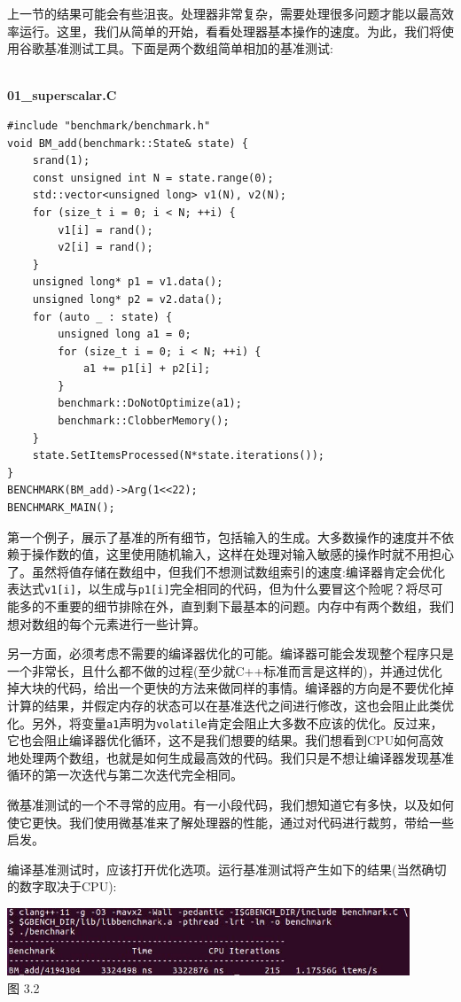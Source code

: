 
上一节的结果可能会有些沮丧。处理器非常复杂，需要处理很多问题才能以最高效率运行。这里，我们从简单的开始，看看处理器基本操作的速度。为此，我们将使用谷歌基准测试工具。下面是两个数组简单相加的基准测试:

\hspace*{\fill} \\ %
\noindent
\textbf{01\_superscalar.C}
\begin{lstlisting}[style=styleCXX]
#include "benchmark/benchmark.h"
void BM_add(benchmark::State& state) {
	srand(1);
	const unsigned int N = state.range(0);
	std::vector<unsigned long> v1(N), v2(N);
	for (size_t i = 0; i < N; ++i) {
		v1[i] = rand();
		v2[i] = rand();
	}
	unsigned long* p1 = v1.data();
	unsigned long* p2 = v2.data();
	for (auto _ : state) {
		unsigned long a1 = 0;
		for (size_t i = 0; i < N; ++i) {
			a1 += p1[i] + p2[i];
		}
		benchmark::DoNotOptimize(a1);
		benchmark::ClobberMemory();
	}
	state.SetItemsProcessed(N*state.iterations());
}
BENCHMARK(BM_add)->Arg(1<<22);
BENCHMARK_MAIN();
\end{lstlisting}

第一个例子，展示了基准的所有细节，包括输入的生成。大多数操作的速度并不依赖于操作数的值，这里使用随机输入，这样在处理对输入敏感的操作时就不用担心了。虽然将值存储在数组中，但我们不想测试数组索引的速度:编译器肯定会优化表达式\texttt{v1[i]}，以生成与\texttt{p1[i]}完全相同的代码，但为什么要冒这个险呢？将尽可能多的不重要的细节排除在外，直到剩下最基本的问题。内存中有两个数组，我们想对数组的每个元素进行一些计算。

另一方面，必须考虑不需要的编译器优化的可能。编译器可能会发现整个程序只是一个非常长，且什么都不做的过程(至少就C++标准而言是这样的)，并通过优化掉大块的代码，给出一个更快的方法来做同样的事情。编译器的方向是不要优化掉计算的结果，并假定内存的状态可以在基准迭代之间进行修改，这也会阻止此类优化。另外，将变量\texttt{a1}声明为\texttt{volatile}肯定会阻止大多数不应该的优化。反过来，它也会阻止编译器优化循环，这不是我们想要的结果。我们想看到CPU如何高效地处理两个数组，也就是如何生成最高效的代码。我们只是不想让编译器发现基准循环的第一次迭代与第二次迭代完全相同。

微基准测试的一个不寻常的应用。有一小段代码，我们想知道它有多快，以及如何使它更快。我们使用微基准来了解处理器的性能，通过对代码进行裁剪，带给一些启发。

编译基准测试时，应该打开优化选项。运行基准测试将产生如下的结果(当然确切的数字取决于CPU):

\begin{center}
\includegraphics[width=0.9\textwidth]{content/1/chapter3/images/2.jpg}\\
图 3.2
\end{center}

